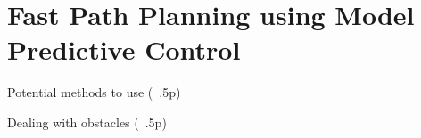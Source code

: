 \section{Fast Path Planning using Model Predictive Control \label{sec:mpc}}
Potential methods to use (~.5p)

Dealing with obstacles (~.5p)